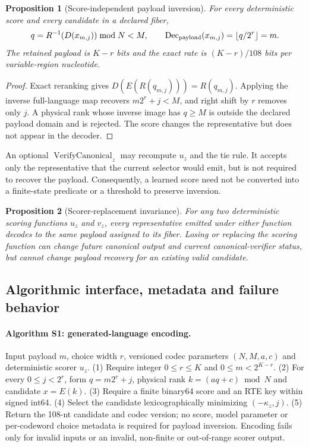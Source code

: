 \documentclass[10pt]{article}
\newtheorem{proposition}{Proposition}
\begin{document}
\begin{proposition}[Score-independent payload inversion]
For every deterministic score and every candidate in a declared fiber,
\[
 q=R^{-1}(D(x_{m,j}))\bmod N<M,\qquad
 \operatorname{Dec}_{\rm payload}(x_{m,j})=
 \left\lfloor q/2^r\right\rfloor=m.
\]
The retained payload is $K-r$ bits and the exact rate is $(K-r)/108$ bits per variable-region nucleotide.
\end{proposition}

\begin{proof}
Exact reranking gives $D(E(R(q_{m,j})))=R(q_{m,j})$. Applying the inverse full-language map recovers $m2^r+j<M$, and right shift by $r$ removes only $j$. A physical rank whose inverse image has $q\geq M$ is outside the declared payload domain and is rejected. The score changes the representative but does not appear in the decoder.
\end{proof}

An optional $\operatorname{VerifyCanonical}_z$ may recompute $u_z$ and the tie rule. It accepts only the representative that the current selector would emit, but is not required to recover the payload. Consequently, a learned score need not be converted into a finite-state predicate or a threshold to preserve inversion.

\begin{proposition}[Scorer-replacement invariance]
For any two deterministic scoring functions $u_z$ and $v_z$, every representative emitted under either function decodes to the same payload assigned to its fiber. Losing or replacing the scoring function can change future canonical output and current canonical-verifier status, but cannot change payload recovery for an existing valid candidate.
\end{proposition}

\subsection{Algorithmic interface, metadata and failure behavior}

\paragraph{Algorithm S1: generated-language encoding.}
Input payload $m$, choice width $r$, versioned codec parameters $(N,M,a,c)$ and deterministic scorer $u_z$. (1) Require integer $0\leq r\leq K$ and $0\leq m<2^{K-r}$. (2) For every $0\leq j<2^r$, form $q=m2^r+j$, physical rank $k=(aq+c)\bmod N$ and candidate $x=E(k)$. (3) Require a finite binary64 score and an RTE key within signed int64. (4) Select the candidate lexicographically minimizing $(-\kappa_z,j)$. (5) Return the 108-nt candidate and codec version; no score, model parameter or per-codeword choice metadata is required for payload inversion. Encoding fails only for invalid inputs or an invalid, non-finite or out-of-range scorer output.
\end{document}
